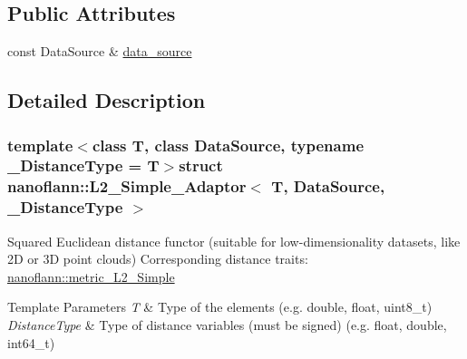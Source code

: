 \subsection*{Public Attributes}
\begin{DoxyCompactItemize}
\item 
const Data\-Source \& \hyperlink{structnanoflann_1_1_l2___simple___adaptor_a43d73454c22f2006e21a7186a67a9537}{data\-\_\-source}
\end{DoxyCompactItemize}


\subsection{Detailed Description}
\subsubsection*{template$<$class T, class Data\-Source, typename \-\_\-\-Distance\-Type = T$>$struct nanoflann\-::\-L2\-\_\-\-Simple\-\_\-\-Adaptor$<$ T, Data\-Source, \-\_\-\-Distance\-Type $>$}

Squared Euclidean distance functor (suitable for low-\/dimensionality datasets, like 2\-D or 3\-D point clouds) Corresponding distance traits\-: \hyperlink{structnanoflann_1_1metric___l2___simple}{nanoflann\-::metric\-\_\-\-L2\-\_\-\-Simple} 
\begin{DoxyTemplParams}{Template Parameters}
{\em T} & Type of the elements (e.\-g. double, float, uint8\-\_\-t) \\
\hline
{\em Distance\-Type} & Type of distance variables (must be signed) (e.\-g. float, double, int64\-\_\-t) \\
\hline
\end{DoxyTemplParams}


